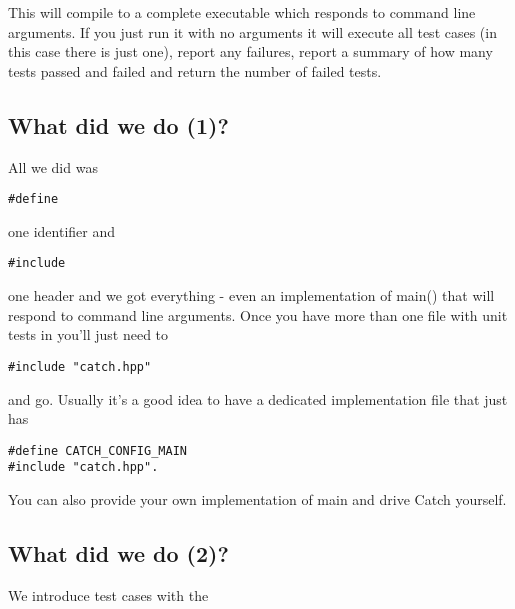\documentclass[%
oneside,                 %
final,                   %
10pt]{article}
\begin{document}
This will compile to a complete executable which responds to command line arguments. If you just run it with no arguments it will execute all test cases (in this case there is just one), report any failures, report a summary of how many tests passed and failed and return the number of failed tests.

\subsection*{What did we do (1)?}
All we did was 


\begin{verbatim}
#define 

\end{verbatim}

one identifier and 


\begin{verbatim}
#include 

\end{verbatim}

one header and we got everything - even an implementation of main() that will respond to command line arguments. 
Once you have more than one file with unit tests in you'll just need to 


\begin{verbatim}
#include "catch.hpp" 

\end{verbatim}

and go. Usually it's a good idea to have a dedicated implementation file that just has 



\begin{verbatim}
#define CATCH_CONFIG_MAIN 
#include "catch.hpp". 

\end{verbatim}

You can also provide your own implementation of main and drive Catch yourself.

\subsection*{What did we do (2)?}
We introduce test cases with the 
\end{document}
